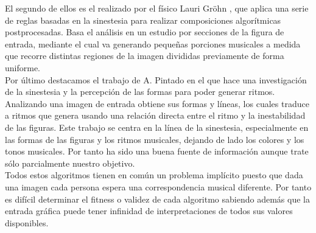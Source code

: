 El segundo de ellos es el realizado por el físico Lauri Gröhn \cite{rusofotos}, que aplica una serie de reglas basadas en la sinestesia para realizar composiciones algorítmicas postprocesadas. Basa el análisis en un estudio por secciones de la figura de entrada, mediante el cual va generando pequeñas porciones musicales a medida que recorre distintas regiones de la imagen divididas previamente de forma uniforme.\\

Por último destacamos el trabajo de A. Pintado \cite{portutesis} en el que hace una investigación de la sinestesia y la percepción de las formas para poder generar ritmos. Analizando una imagen de entrada obtiene sus formas y líneas, los cuales traduce a ritmos que genera usando  una relación directa entre el ritmo y la inestabilidad de las figuras. Este trabajo se centra en la línea de la sinestesia, especialmente en las formas de las figuras y los ritmos musicales, dejando de lado los colores y los tonos musicales. Por tanto ha sido una buena fuente de información aunque trate sólo parcialmente nuestro objetivo.\\ 

Todos estos algoritmos tienen en común un problema implícito puesto que dada una imagen cada persona espera una correspondencia musical diferente. Por tanto es difícil determinar el fitness o validez de cada algoritmo sabiendo además que la entrada gráfica puede tener infinidad de interpretaciones de todos sus valores disponibles.

